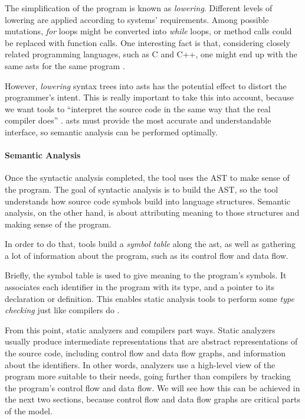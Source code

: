 The simplification of the program is known as \emph{lowering}. Different levels of lowering are applied according to systems' requirements. Among possible mutations, \emph{for} loops might be converted into \emph{while} loops, or method calls could be replaced with function calls. One interesting fact is that, considering closely related programming languages, such as C and C++, one might end up with the same \glspl{ast} for the same program \cite{chess2007secure, collin2015compilation}.

However, \emph{lowering} syntax trees into \glspl{ast} has the potential effect to distort the programmer's intent. This is really important to take this into account, because we want tools to ``interpret the source code in the same way that the real compiler does'' \cite{anderson2008use}. \glspl{ast} must provide the most accurate and understandable interface, so semantic analysis can be performed optimally.

\clearpage

\paragraph{Semantic Analysis}

Once the syntactic analysis completed, the tool uses the AST to make sense of the program. The goal of syntactic analysis is to build the AST, so the tool understands how source code symbols build into language structures. Semantic analysis, on the other hand, is about attributing meaning to those structures and making sense of the program.

In order to do that, tools build a \emph{symbol table} along the \gls{ast}, as well as gathering a lot of information about the program, such as its control flow and data flow.

Briefly, the symbol table is used to give meaning to the program's symbols. It associates each identifier in the program with its type, and a pointer to its declaration or definition. This enables static analysis tools to perform some \emph{type checking} just like compilers do \cite{chess2007secure}.

From this point, static analyzers and compilers part ways. Static analyzers usually produce intermediate representations that are abstract representations of the source code, including control flow and data flow graphs, and information about the identifiers. In other words, analyzers use a high-level view of the program more suitable to their needs, going further than compilers by tracking the program's control flow and data flow. We will see how this can be achieved in the next two sections, because control flow and data flow graphs are critical parts of the model.

